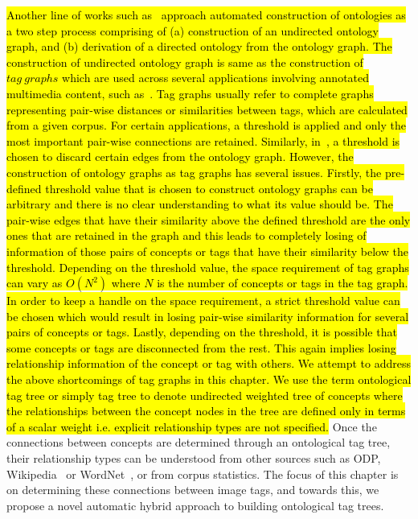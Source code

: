 {\hl{Another line of works such as~{\cite{feiliang2012demo}}{\cite{ren2012cheap}}{\cite{heymann2006collaborative}}  approach automated construction of ontologies as a two step process comprising of (a) construction of an undirected ontology graph, and (b) derivation of a directed ontology from the ontology graph. The construction of undirected ontology graph is same as the construction of {$tag~graphs$} which are used across several applications involving annotated multimedia content, such as{~\cite{liu2009tag}}. 
Tag graphs usually refer to complete graphs representing pair-wise distances or similarities between tags, which are calculated from a given corpus.  For certain applications, a threshold is applied and only the most important pair-wise connections are retained. Similarly, in~{\cite{feiliang2012demo}}{\cite{ren2012cheap}}{\cite{heymann2006collaborative}}, a threshold is chosen to discard certain edges from the ontology graph. However, the construction of ontology graphs as tag graphs has several issues. Firstly, the pre-defined threshold value that is chosen to construct ontology graphs can be arbitrary and there is no clear understanding to what its value should be. The pair-wise edges that have their similarity above the defined threshold are the only ones that are retained in the graph and this leads to completely losing of information of those pairs of concepts or tags that have their similarity below the threshold. Depending on the threshold value, the space requirement of tag graphs can vary as $O(N^2)$ where $N$ is the number of concepts or tags in the tag graph. In order to keep a handle on the space requirement, a strict threshold value can be chosen which would result in losing pair-wise similarity information for several pairs of concepts or tags. Lastly, depending on the threshold, it is possible that some concepts or tags are disconnected from the rest. This again implies losing relationship information of the concept or tag with others. We attempt to address the above shortcomings of tag graphs in this chapter. We use the term ontological tag tree or simply tag tree to denote undirected weighted tree of concepts where the relationships between the concept nodes in the tree are defined only in terms of a scalar weight i.e. explicit relationship types are not specified.} Once the connections between concepts are determined through an ontological tag tree, their relationship types can be understood from other sources such as ODP, Wikipedia~\cite{website:Wikipedia} or WordNet~\cite{wordnet}, or from corpus statistics. The focus of this chapter is on determining these connections between image tags, and towards this, we propose a novel automatic hybrid approach to building ontological tag trees. 
}
